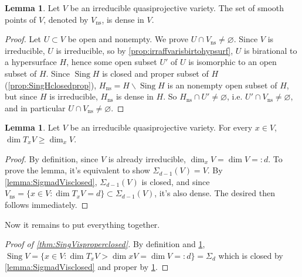 \documentclass{article}
\newcommand{\Sing}{\operatorname{Sing}}
\newcommand{\ns}{{\operatorname{ns}}}
\theoremstyle{definition}
\newtheorem{lemma}[defn]{Lemma}
\begin{document}
\begin{lemma}
\label{lemma:Vnsisdense}
Let $V$ be an irreducible quasiprojective variety. The set of smooth points of $V$, denoted by $V_\ns$, is dense in $V$.
\end{lemma}
\begin{proof}
Let $U\subset V$ be open and nonempty. We prove $U\cap V_{\ns}\neq\varnothing$. Since $V$ is irreducible, $U$ is irreducible, so by \ref{prop:irraffvarisbirtohypsurf}, $U$ is birational to a hypersurface $H$, hence some open subset $U'$ of $U$ is isomorphic to an open subset of $H$. Since $\Sing H$ is closed and proper subset of $H$ (\ref{prop:SingHclosedprop}), $H_\ns=H\backslash\Sing H$ is an nonempty open subset of $H$, but since $H$ is irreducible, $H_\ns$ is dense in $H$. So $H_\ns\cap U'\neq\varnothing$, i.e. $U'\cap V_\ns\neq\varnothing$, and in particular $U\cap V_\ns\neq\varnothing$.
\end{proof}

\begin{lemma}
\label{lemma:dimTxVgeqdimxV}
Let $V$ be an irreducible quasiprojective variety. For every $x\in V$, $\dim T_xV\geq\dim_xV$.
\end{lemma}
\begin{proof}
By definition, since $V$ is already irreducible, $\dim_xV=\dim V=:d$. To prove the lemma, it's equivalent to show $\Sigma_{d-1}(V)=V$. By \ref{lemma:SigmadVisclosed}, $\Sigma_{d-1}(V)$ is closed, and since $V_\ns=\{x\in V:\dim T_xV=d\}\subset\Sigma_{d-1}(V)$, it's also dense. The desired then follows immediately.
\end{proof}

Now it remains to put everything together.

\begin{proof}[Proof of \ref{thm:SingVisproperclosed}]
By definition and \ref{lemma:dimTxVgeqdimxV}, $\Sing V=\{x\in V:\dim T_xV>\dim xV=\dim V=:d\}=\Sigma_d$ which is closed by \ref{lemma:SigmadVisclosed} and proper by \ref{lemma:Vnsisdense}.
\end{proof}
\end{document}
